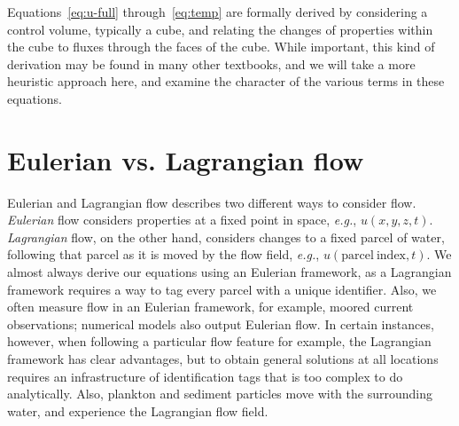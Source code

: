 \documentclass[11pt]{report}
\numberwithin{equation}{section}
\begin{document}

Equations~\ref{eq:u-full} through~\ref{eq:temp} are formally derived by considering a control volume, typically a cube, and relating the changes of properties within the cube to fluxes through the faces of the cube.  While important, this kind of derivation may be found in many other textbooks, and we will take a more heuristic approach here, and examine the character of the various terms in these equations.

\section{Eulerian vs. Lagrangian flow} 

Eulerian and Lagrangian flow describes two different ways to consider flow.  {\it Eulerian} flow considers properties at a fixed point in space, \emph{e.g.}, $u(x, y, z, t)$. {\it Lagrangian} flow, on the other hand, considers changes to a fixed parcel of water, following that parcel as it is moved by the flow field, \emph{e.g.}, $u(\mathrm{parcel~index}, t)$.  We almost always derive our equations using an Eulerian framework, as a Lagrangian framework requires a way to tag every parcel with a unique identifier.  Also, we often measure flow in an Eulerian framework, for example, moored current observations;  numerical models also output Eulerian flow.  In certain instances, however, when following a particular flow feature for example, the Lagrangian framework has clear advantages, but to obtain general solutions at all locations requires an infrastructure of identification tags that is too complex to do analytically.  Also, plankton and sediment particles move with the surrounding water, and experience the Lagrangian flow field.
\end{document}
